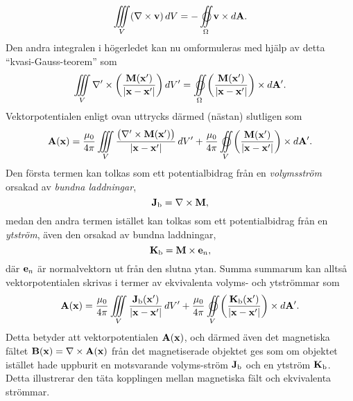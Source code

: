 $$
  \iiint_V(\nabla\times{\bf v})\,dV = -\oiint_{\Omega} {\bf v}\times d{\bf A}.
$$
Den andra integralen i h{\"o}gerledet kan nu omformuleras med hj{\"a}lp av
detta ``kvasi-Gauss-teorem'' som
$$
  \iiint_V
  \nabla'\times\bigg({{{\bf M}({\bf x}')}\over{|{\bf x}-{\bf x}'|}}\bigg)\,dV'
  = \oiint_{\Omega}
  \bigg({{{\bf M}({\bf x}')}\over{|{\bf x}-{\bf x}'|}}\bigg)\times d{\bf A}'.
$$
Vektorpotentialen enligt ovan uttrycks d{\"a}rmed (n{\"a}stan) slutligen som
$$
  {\bf A}({\bf x}) = {{\mu_0}\over{4\pi}}\iiint_V
    {{\big(\nabla'\times{\bf M}({\bf x}')\big)}\over{|{\bf x}-{\bf x}'|}}\,dV'
  +{{\mu_0}\over{4\pi}}\oiint_V
     \bigg({{{\bf M}({\bf x}')}\over{|{\bf x}-{\bf x}'|}}\bigg)\times d{\bf A}'.
$$
Den f{\"o}rsta termen kan tolkas som ett potentialbidrag fr{\aa}n en
{\it volymsstr{\"o}m} orsakad av {\it bundna laddningar},
$$
  {\bf J}_{\rm b}=\nabla\times{\bf M},
$$
medan den andra termen ist{\"a}llet kan tolkas som ett potentialbidrag fr{\aa}n
en {\it ytstr{\"o}m}, {\"a}ven den orsakad av bundna laddningar,
$$
  {\bf K}_{\rm b}={\bf M}\times{\bf e}_n,
$$
d{\"a}r ${\bf e}_n$ {\"a}r normalvektorn ut fr{\aa}n den slutna ytan. Summa
summarum kan allts{\aa} vektorpotentialen skrivas i termer av ekvivalenta
volyms- och ytstr{\"o}mmar som
$$
  {\bf A}({\bf x}) = {{\mu_0}\over{4\pi}}\iiint_V
    {{{\bf J}_{\rm b}({\bf x}')}\over{|{\bf x}-{\bf x}'|}}\,dV'
  +{{\mu_0}\over{4\pi}}\oiint_V
    \bigg({{{\bf K}_{\rm b}({\bf x}')}\over{|{\bf x}-{\bf x}'|}}\bigg)\times d{\bf A}'.
$$
Detta betyder att vektorpotentialen ${\bf A}({\bf x})$, och d{\"a}rmed {\"a}ven
det magnetiska f{\"a}ltet ${\bf B}({\bf x})=\nabla\times{\bf A}({\bf x})$
fr{\aa}n det magnetiserade objektet ges som om objektet ist{\"a}llet hade
uppburit en motsvarande volyms-str{\"o}m ${\bf J}_{\rm b}$ och en ytstr{\"o}m
${\bf K}_{\rm b}$. Detta illustrerar den t{\"a}ta kopplingen mellan magnetiska
f{\"a}lt och ekvivalenta str{\"o}mmar.
\bye
